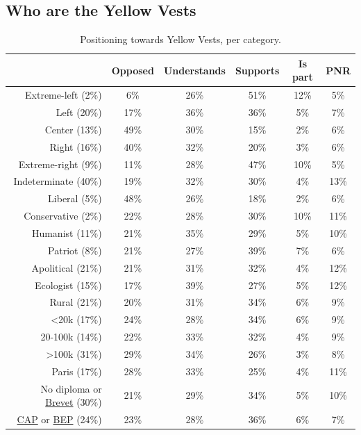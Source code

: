 \documentclass[english,5p,authoryear]{elsarticle}
\begin{document}
\begin{appendices}
%

%

\section{Who are the Yellow Vests\label{app:stats_des}}

%

\begin{spacing}{1.8}
\begin{table}[ht]
\centering
\caption{Positioning towards Yellow Vests, per category.}
{\fontsize{10}{16}\selectfont
\begin{tabular}{rccccc}
  \hline \hline
 & Opposed & Understands & Supports & Is part & PNR \\ 
  \hline
  Extreme-left (2\%) & 6\% & 26\% & 51\% & 12\% & 5\% \\ 
  Left (20\%) & 17\% & 36\% & 36\% & 5\% & 7\% \\ 
  Center (13\%) & 49\% & 30\% & 15\% & 2\% & 6\% \\ 
  Right (16\%) & 40\% & 32\% & 20\% & 3\% & 6\% \\ 
  Extreme-right (9\%) & 11\% & 28\% & 47\% & 10\% & 5\% \\
  Indeterminate (40\%) & 19\% & 32\% & 30\% & 4\% & 13\% \\
  \hline
  Liberal (5\%) & 48\% & 26\% & 18\% & 2\% & 6\% \\
  Conservative (2\%) & 22\% & 28\% & 30\% & 10\% & 11\% \\
  Humanist (11\%) & 21\% & 35\% & 29\% & 5\% & 10\% \\
  Patriot (8\%) & 21\% & 27\% & 39\% & 7\% & 6\% \\
  Apolitical (21\%) & 21\% & 31\% & 32\% & 4\% & 12\% \\
  Ecologist (15\%) & 17\% & 39\% & 27\% & 5\% & 12\% \\
  \hline
  Rural (21\%) & 20\% & 31\% & 34\% & 6\% & 9\% \\ 
  <20k (17\%) & 24\% & 28\% & 34\% & 6\% & 9\% \\ 
  20-100k (14\%) & 22\% & 33\% & 32\% & 4\% & 9\% \\ 
  >100k (31\%) & 29\% & 34\% & 26\% & 3\% & 8\% \\ 
  Paris (17\%) & 28\% & 33\% & 25\% & 4\% & 11\% \\
  \hline
  No diploma or \uline{Brevet} (30\%) & 21\% & 29\% & 34\% & 5\% & 10\% \\ 
  \uline{CAP} or \uline{BEP} (24\%) & 23\% & 28\% & 36\% & 6\% & 7\% \\ 

\end{tabular}}
\end{table}
\end{spacing}
\end{appendices}
\end{document}
